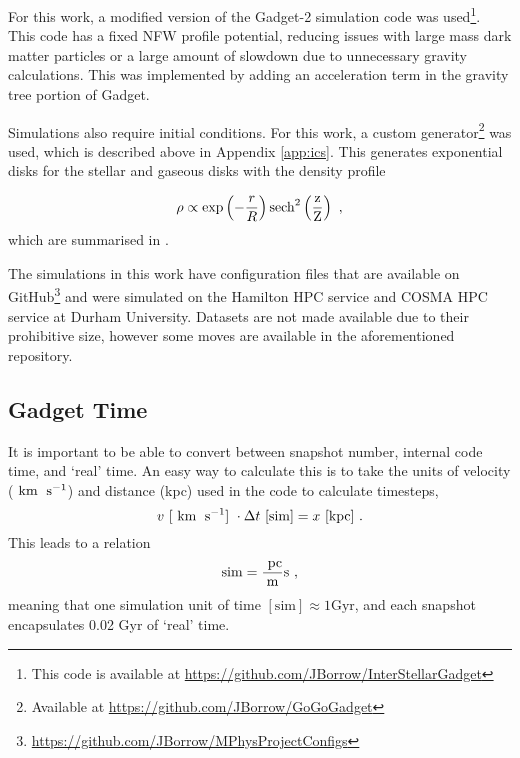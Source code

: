 For this work, a modified version of the Gadget-2 simulation code \citep{springel_cosmological_2005} was
used\footnote{This code is available at
  \url{https://github.com/JBorrow/InterStellarGadget}}. This code has a fixed
NFW profile potential, reducing issues with large mass dark matter
particles or a large amount of slowdown due to unnecessary gravity
calculations. This was implemented by adding an acceleration term in the
gravity tree portion of Gadget.

Simulations also require initial conditions. For this work, a custom
generator\footnote{Available at \url{https://github.com/JBorrow/GoGoGadget}}
was used, which is described above in Appendix \ref{app:ics}. This generates exponential disks for the stellar and gaseous
disks with the density profile

\begin{equation}
\rho \propto \exp\left(-\frac{r}{R}\right)\rm{sech}^2\left(\frac{z}{Z}\right)~,
\end{equation}
which are summarised in \citet{ferriere_interstellar_2001}.

The simulations in this work have configuration files that are
available on GitHub\footnote{\url{https://github.com/JBorrow/MPhysProjectConfigs}} and were simulated on the
Hamilton HPC service and COSMA HPC service at Durham University. Datasets are not made
available due to their prohibitive size, however some moves are
available in the aforementioned repository.

\subsection{Gadget Time}
\label{app:gadgettime}

It is important to be able to convert between snapshot number, internal code time, and `real' time.
An easy way to calculate this is to take the units of velocity ($~\mathrm{km}\;~\mathrm{s}^{-1}$) and distance (kpc) used in the code to calculate timesteps,
$$
    v ~ [~\mathrm{km}\;~\mathrm{s}^{-1}] ~ \cdot \Delta t ~ [\mathrm{sim}] = x ~ [\mathrm{kpc}]~.
$$
This leads to a relation
$$
    \mathrm{sim} = \frac{~\mathrm{pc}}{\mathrm{m}} \mathrm{s}~,
$$
meaning that one simulation unit of time $[\mathrm{sim}] \approx 1 \mathrm{Gyr}$, and each snapshot encapsulates 0.02 Gyr of `real' time.
